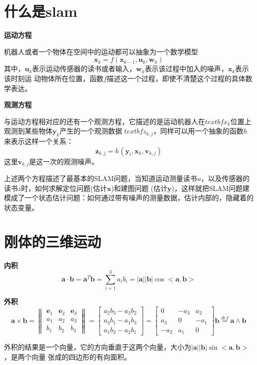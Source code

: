 \documentclass[10pt]{article}
\begin{document}
\tableofcontents
\section{什么是slam}
\textbf{运动方程}

机器人或者一个物体在空间中的运动都可以抽象为一个数学模型
$$ \textbf{x}_k=f(\textbf{x}_{k-1},\textbf{u}_k,\textbf{w}_k) $$
\indent 其中，$\textbf{u}_k$表示运动传感器的读书或者输入，$\textbf{w}_k$表示该过程中加入的噪声，$\textbf{x}_k$表示该时刻运
动物体所在位置，函数$f$描述这一个过程，即使不清楚这个过程的具体数学表达。

\textbf{观测方程}

与运动方程相对应的还有一个观测方程，它描述的是运动机器人在$textbf{x}_k$位置上观测到某些物体$\textbf{y}_k$产生的一个观测数据
$textbf{z}_{k,j}$，同样可以用一个抽象的函数$h$来表示这样一个关系：
$$\textbf{z}_{k,j}=h(\textbf{y}_i,\textbf{x}_k,\textbf{v}_{k,j})$$
\indent 这里$\textbf{v}_{k,j}$是这一次的观测噪声。

上述两个方程描述了最基本的SLAM问题，当知道运动测量读书$u$，以及传感器的读书$z$时，如何求解定位问题(估计$\textbf{x}$)和建图问题
(估计$\textbf{y}$)，这样就把SLAM问题建模成了一个状态估计问题：如何通过带有噪声的测量数据，估计内部的，隐藏着的状态变量。
\section{刚体的三维运动}
\textbf{内积}
$$\textbf{a} \cdot \textbf{b}=\textbf{a}^{T}\textbf{b}=\sum_{i=1}^{3}a_{i}b_{i}=|\textbf{a}||\textbf{b}|\cos<\textbf{a},
\textbf{b}>$$

\textbf{外积}
$$\textbf{a}\times\textbf{b}=\left\|\begin{array}{lll}\textbf{e}_1 & \textbf{e}_2 & \textbf{e}_3 \\ a_1 & a_2 &
    a_3 \\ b_1 & b_2 & b_3 \end{array}\right\|=\left[\begin{array}{l}a_2b_3-a_3b_2 \\ a_3b_1-a_1b_3 \\ a_1b_2-a_2
        b_1\end{array}\right]=\left[\begin{array}{ccc}0 & -a_3 & a_2 \\ a_3 & 0 & -a_1 \\ -a_2 & a_1 & 0\end{array}
        \right]\textbf{b} \overset{def}{=}\textbf{a} \wedge \textbf{b}$$

外积的结果是一个向量，它的方向垂直于这两个向量，大小为$|\textbf{a}||\textbf{b}|\sin<\textbf{a},\textbf{b}>$，是两个向量
张成的四边形的有向面积。
\end{document}
